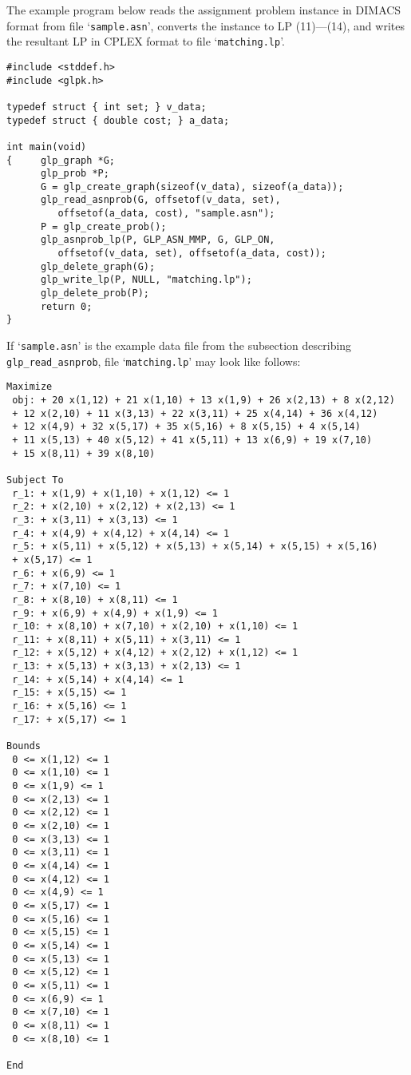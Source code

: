 \documentclass[11pt]{report}
\def\para#1{\noindent{\bf#1}}
\begin{document}
\para{Example}

The example program below reads the assignment problem instance in
DIMACS format from file `\verb|sample.asn|', converts the instance to
LP (11)---(14), and writes the resultant LP in CPLEX format to file
`\verb|matching.lp|'.

\begin{footnotesize}
\begin{verbatim}
#include <stddef.h>
#include <glpk.h>

typedef struct { int set; } v_data;
typedef struct { double cost; } a_data;

int main(void)
{     glp_graph *G;
      glp_prob *P;
      G = glp_create_graph(sizeof(v_data), sizeof(a_data));
      glp_read_asnprob(G, offsetof(v_data, set),
         offsetof(a_data, cost), "sample.asn");
      P = glp_create_prob();
      glp_asnprob_lp(P, GLP_ASN_MMP, G, GLP_ON,
         offsetof(v_data, set), offsetof(a_data, cost));
      glp_delete_graph(G);
      glp_write_lp(P, NULL, "matching.lp");
      glp_delete_prob(P);
      return 0;
}
\end{verbatim}
\end{footnotesize}

\newpage

If `\verb|sample.asn|' is the example data file from the subsection
describing \verb|glp_read_asnprob|, file `\verb|matching.lp|' may look
like follows:

\begin{footnotesize}
\begin{verbatim}
Maximize
 obj: + 20 x(1,12) + 21 x(1,10) + 13 x(1,9) + 26 x(2,13) + 8 x(2,12)
 + 12 x(2,10) + 11 x(3,13) + 22 x(3,11) + 25 x(4,14) + 36 x(4,12)
 + 12 x(4,9) + 32 x(5,17) + 35 x(5,16) + 8 x(5,15) + 4 x(5,14)
 + 11 x(5,13) + 40 x(5,12) + 41 x(5,11) + 13 x(6,9) + 19 x(7,10)
 + 15 x(8,11) + 39 x(8,10)

Subject To
 r_1: + x(1,9) + x(1,10) + x(1,12) <= 1
 r_2: + x(2,10) + x(2,12) + x(2,13) <= 1
 r_3: + x(3,11) + x(3,13) <= 1
 r_4: + x(4,9) + x(4,12) + x(4,14) <= 1
 r_5: + x(5,11) + x(5,12) + x(5,13) + x(5,14) + x(5,15) + x(5,16)
 + x(5,17) <= 1
 r_6: + x(6,9) <= 1
 r_7: + x(7,10) <= 1
 r_8: + x(8,10) + x(8,11) <= 1
 r_9: + x(6,9) + x(4,9) + x(1,9) <= 1
 r_10: + x(8,10) + x(7,10) + x(2,10) + x(1,10) <= 1
 r_11: + x(8,11) + x(5,11) + x(3,11) <= 1
 r_12: + x(5,12) + x(4,12) + x(2,12) + x(1,12) <= 1
 r_13: + x(5,13) + x(3,13) + x(2,13) <= 1
 r_14: + x(5,14) + x(4,14) <= 1
 r_15: + x(5,15) <= 1
 r_16: + x(5,16) <= 1
 r_17: + x(5,17) <= 1

Bounds
 0 <= x(1,12) <= 1
 0 <= x(1,10) <= 1
 0 <= x(1,9) <= 1
 0 <= x(2,13) <= 1
 0 <= x(2,12) <= 1
 0 <= x(2,10) <= 1
 0 <= x(3,13) <= 1
 0 <= x(3,11) <= 1
 0 <= x(4,14) <= 1
 0 <= x(4,12) <= 1
 0 <= x(4,9) <= 1
 0 <= x(5,17) <= 1
 0 <= x(5,16) <= 1
 0 <= x(5,15) <= 1
 0 <= x(5,14) <= 1
 0 <= x(5,13) <= 1
 0 <= x(5,12) <= 1
 0 <= x(5,11) <= 1
 0 <= x(6,9) <= 1
 0 <= x(7,10) <= 1
 0 <= x(8,11) <= 1
 0 <= x(8,10) <= 1

End
\end{verbatim}
\end{footnotesize}
\end{document}
